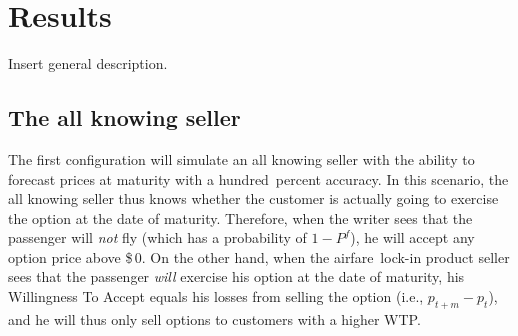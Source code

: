 \chapter{Results}
Insert general description.

\section{The all knowing seller}
The first configuration will simulate an all knowing seller with the ability to forecast prices at maturity with a hundred~percent accuracy. In this scenario, the all knowing seller thus knows whether the customer is actually going to exercise the option at the date of maturity. Therefore, when the writer sees that the passenger will \emph{not} fly (which has a probability of $1-P^f$), he will accept any option price above \$\,0. On the other hand, when the airfare~lock-in product seller sees that the passenger \emph{will} exercise his option at the date of maturity, his Willingness To Accept equals his losses from selling the option (i.e., $p_{t+m} - p_t$), and he will thus only sell options to customers with a higher WTP. 


